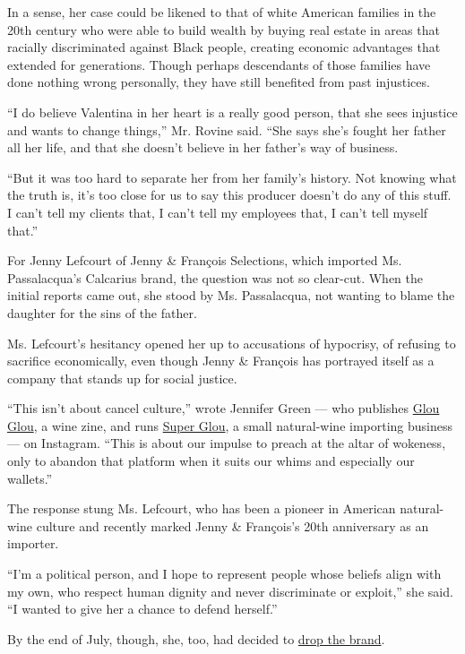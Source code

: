 In a sense, her case could be likened to that of white American families
in the 20th century who were able to build wealth by buying real estate
in areas that racially discriminated against Black people, creating
economic advantages that extended for generations. Though perhaps
descendants of those families have done nothing wrong personally, they
have still benefited from past injustices.

``I do believe Valentina in her heart is a really good person, that she
sees injustice and wants to change things,'' Mr. Rovine said. ``She says
she's fought her father all her life, and that she doesn't believe in
her father's way of business.

``But it was too hard to separate her from her family's history. Not
knowing what the truth is, it's too close for us to say this producer
doesn't do any of this stuff. I can't tell my clients that, I can't tell
my employees that, I can't tell myself that.''

For Jenny Lefcourt of Jenny \& François Selections, which imported Ms.
Passalacqua's Calcarius brand, the question was not so clear-cut. When
the initial reports came out, she stood by Ms. Passalacqua, not wanting
to blame the daughter for the sins of the father.

Ms. Lefcourt's hesitancy opened her up to accusations of hypocrisy, of
refusing to sacrifice economically, even though Jenny \& François has
portrayed itself as a company that stands up for social justice.

``This isn't about cancel culture,'' wrote Jennifer Green --- who
publishes \href{https://www.glougloumagazine.com/}{Glou Glou}, a wine
zine, and runs \href{https://www.superglou.com/new-glou}{Super Glou}, a
small natural-wine importing business --- on Instagram. ``This is about
our impulse to preach at the altar of wokeness, only to abandon that
platform when it suits our whims and especially our wallets.''

The response stung Ms. Lefcourt, who has been a pioneer in American
natural-wine culture and recently marked Jenny \& François's 20th
anniversary as an importer.

``I'm a political person, and I hope to represent people whose beliefs
align with my own, who respect human dignity and never discriminate or
exploit,'' she said. ``I wanted to give her a chance to defend
herself.''

By the end of July, though, she, too, had decided to
\href{https://www.instagram.com/p/CDUham7J6JP/}{drop the brand}.

